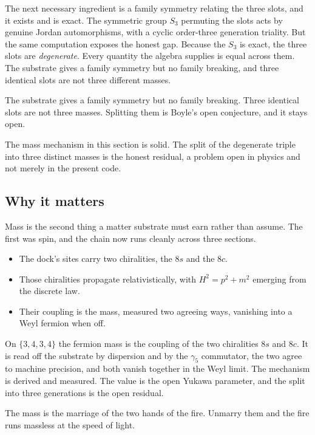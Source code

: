 The next necessary ingredient is a family symmetry relating the three slots, and it exists and is exact. The symmetric group $S_3$ permuting the slots acts by genuine Jordan automorphisms, with a cyclic order-three generation triality. But the same computation exposes the honest gap. Because the $S_3$ is exact, the three slots are \emph{degenerate}. Every quantity the algebra supplies is equal across them. The substrate gives a family symmetry but no family breaking, and three identical slots are not three different masses.

\begin{principle}
The substrate gives a family symmetry but no family breaking. Three identical slots are not three masses. Splitting them is Boyle's open conjecture, and it stays open.
\end{principle}

The mass mechanism in this section is solid. The split of the degenerate triple into three distinct masses is the honest residual, a problem open in physics and not merely in the present code.

\subsection{Why it matters}

Mass is the second thing a matter substrate must earn rather than assume. The first was spin, and the chain now runs cleanly across three sections.

\begin{itemize}
\item The dock's sites carry two chiralities, the $8s$ and the $8c$.
\item Those chiralities propagate relativistically, with $H^2 = p^2 + m^2$ emerging from the discrete law.
\item Their coupling is the mass, measured two agreeing ways, vanishing into a Weyl fermion when off.
\end{itemize}

\begin{result}
On $\{3,4,3,4\}$ the fermion mass is the coupling of the two chiralities $8s$ and $8c$. It is read off the substrate by dispersion and by the $\gamma_5$ commutator, the two agree to machine precision, and both vanish together in the Weyl limit. The mechanism is derived and measured. The value is the open Yukawa parameter, and the split into three generations is the open residual.
\end{result}

\begin{principle}
The mass is the marriage of the two hands of the fire. Unmarry them and the fire runs massless at the speed of light.
\end{principle}
